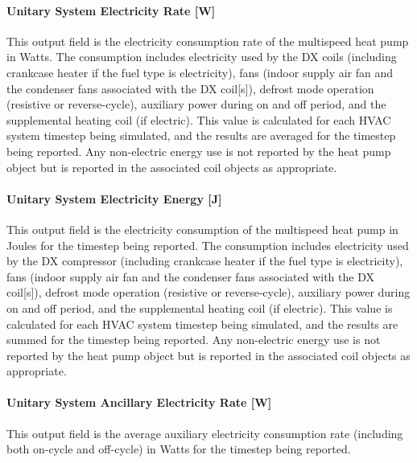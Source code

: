 \paragraph{Unitary System Electricity Rate {[}W{]}}\label{unitary-system-electric-power-w-1}

This output field is the electricity consumption rate of the multispeed heat pump in Watts. The consumption includes electricity used by the DX coils (including crankcase heater if the fuel type is electricity), fans (indoor supply air fan and the condenser fans associated with the DX coil{[}s{]}), defrost mode operation (resistive or reverse-cycle), auxiliary power during on and off period, and the supplemental heating coil (if electric). This value is calculated for each HVAC system timestep being simulated, and the results are averaged for the timestep being reported. Any non-electric energy use is not reported by the heat pump object but is reported in the associated coil objects as appropriate.

\paragraph{Unitary System Electricity Energy {[}J{]}}\label{unitary-system-electric-energy-j-1}

This output field is the electricity consumption of the multispeed heat pump in Joules for the timestep being reported. The consumption includes electricity used by the DX compressor (including crankcase heater if the fuel type is electricity), fans (indoor supply air fan and the condenser fans associated with the DX coil{[}s{]}), defrost mode operation (resistive or reverse-cycle), auxiliary power during on and off period, and the supplemental heating coil (if electric). This value is calculated for each HVAC system timestep being simulated, and the results are summed for the timestep being reported. Any non-electric energy use is not reported by the heat pump object but is reported in the associated coil objects as appropriate.

\paragraph{Unitary System Ancillary Electricity Rate {[}W{]}}\label{unitary-system-ancillary-electric-power-w-1}

This output field is the average auxiliary electricity consumption rate (including both on-cycle and off-cycle) in Watts for the timestep being reported.

